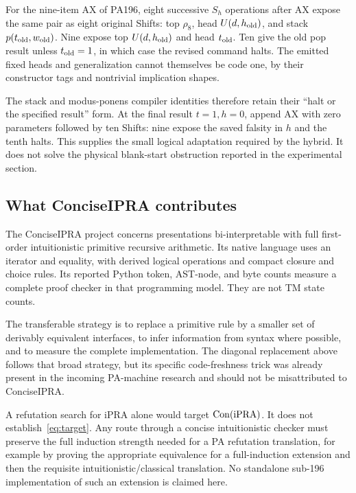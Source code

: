 For the nine-item AX of PA196, eight successive $S_h$ operations after AX expose the same pair as eight original Shifts: top $\rho_8$, head $U(d,h_{\rm old})$, and stack $p(t_{\rm old},w_{\rm old})$. Nine expose top $U(d,h_{\rm old})$ and head $t_{\rm old}$. Ten give the old pop result unless $t_{\rm old}=1$, in which case the revised command halts. The emitted fixed heads and generalization cannot themselves be code one, by their constructor tags and nontrivial implication shapes.

The stack and modus-ponens compiler identities therefore retain their ``halt or the specified result'' form. At the final result $t=1,h=0$, append AX with zero parameters followed by ten Shifts: nine expose the saved falsity in $h$ and the tenth halts. This supplies the small logical adaptation required by the hybrid. It does not solve the physical blank-start obstruction reported in the experimental section.

\subsection{What ConciseIPRA contributes}
The ConciseIPRA project concerns presentations bi-interpretable with full first-order intuitionistic primitive recursive arithmetic. Its native language uses an iterator and equality, with derived logical operations and compact closure and choice rules. Its reported Python token, AST-node, and byte counts measure a complete proof checker in that programming model. They are not TM state counts.

The transferable strategy is to replace a primitive rule by a smaller set of derivably equivalent interfaces, to infer information from syntax where possible, and to measure the complete implementation. The diagonal replacement above follows that broad strategy, but its specific code-freshness trick was already present in the incoming PA-machine research and should not be misattributed to ConciseIPRA.

A refutation search for iPRA alone would target $\operatorname{Con}(\mathrm{iPRA})$. It does not establish~\eqref{eq:target}. Any route through a concise intuitionistic checker must preserve the full induction strength needed for a PA refutation translation, for example by proving the appropriate equivalence for a full-induction extension and then the requisite intuitionistic/classical translation. No standalone sub-196 implementation of such an extension is claimed here.
